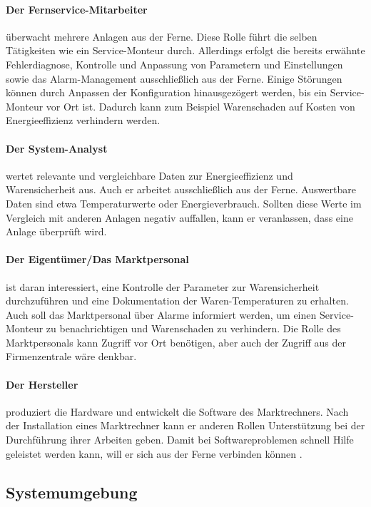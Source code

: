 \documentclass[11pt,a4paper]{report}
\begin{document}
\paragraph{Der Fernservice-Mitarbeiter} überwacht mehrere Anlagen aus der Ferne. Diese Rolle führt die selben Tätigkeiten wie ein Service-Monteur durch. Allerdings erfolgt die bereits erwähnte Fehlerdiagnose, Kontrolle und Anpassung von Parametern und Einstellungen sowie das Alarm-Management ausschließlich aus der Ferne. Einige Störungen können durch Anpassen der Konfiguration hinausgezögert werden, bis ein Service-Monteur vor Ort ist. Dadurch kann zum Beispiel Warenschaden auf Kosten von Energieeffizienz verhindern werden.

\paragraph{Der System-Analyst} wertet relevante und vergleichbare Daten zur Energieeffizienz und Warensicherheit aus. Auch er arbeitet ausschließlich aus der Ferne. Auswertbare Daten sind etwa Temperaturwerte oder Energieverbrauch. Sollten diese Werte im Vergleich mit anderen Anlagen negativ auffallen, kann er veranlassen, dass eine Anlage überprüft wird.

\paragraph{Der Eigentümer/Das Marktpersonal} ist daran interessiert, eine Kontrolle der Parameter zur Warensicherheit durchzuführen und eine Dokumentation der Waren-Temperaturen zu erhalten. Auch soll das Marktpersonal über Alarme informiert werden, um einen Service-Monteur zu benachrichtigen und Warenschaden zu verhindern. Die Rolle des Marktpersonals kann Zugriff vor Ort benötigen, aber auch der Zugriff aus der Firmenzentrale wäre denkbar.

\paragraph{Der Hersteller} produziert die Hardware und entwickelt die Software des Marktrechners. Nach der Installation eines Marktrechner kann er anderen Rollen Unterstützung bei der Durchführung ihrer Arbeiten geben. Damit bei Softwareproblemen schnell Hilfe geleistet werden kann, will er sich aus der Ferne verbinden können	. 

\subsection{Systemumgebung}
\end{document}
